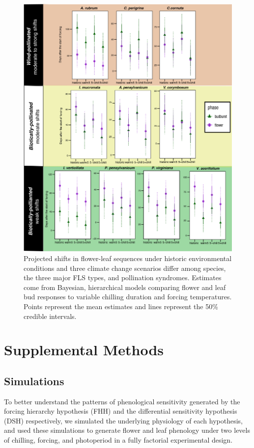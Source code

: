 \documentclass{article}\usepackage[]{graphicx}\usepackage[]{color}
\begin{document}
 \begin{figure}[!ht]
    \centering
 \includegraphics[width=\textwidth]{..//Plots/Flobuds_manuscript_figs/climpredictions.jpg}
    \caption{Projected shifts in flower-leaf sequences under historic environmental conditions and three climate change scenarios differ among species, the three major FLS types, and pollination syndromes. Estimates come from Bayesian, hierarchical models comparing flower and leaf bud responses to variable chilling duration and forcing temperatures. Points represent the mean estimates and lines represent the 50\% credible intervals.}
    \label{fig:preddy_sp}
\end{figure}


\section*{Supplemental Methods}
\subsection*{Simulations}
\noident To better understand the patterns of phenological sensitivity generated by the forcing hierarchy hypothesis (FHH) and the differential sensitivity hypothesis (DSH) respectively, we simulated the underlying physiology of each hypothesis, and used these simulations to generate flower and leaf phenology under two levels of chilling, forcing, and photoperiod in a fully factorial experimental design.\\
\end{document}
